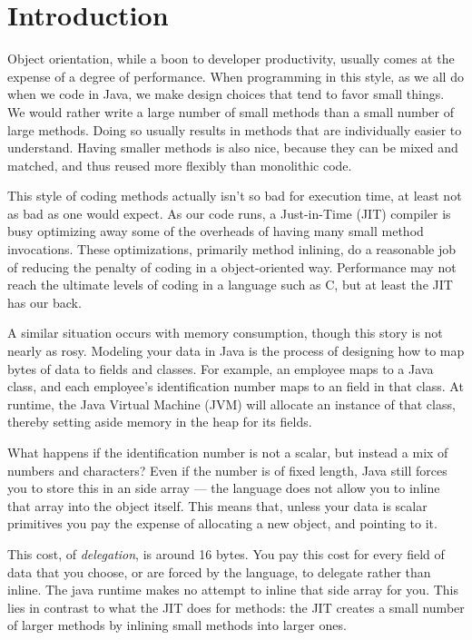 
\chapter{Introduction}
\label{chapter:introduction}

Object orientation, while a boon to developer productivity, usually comes at the
expense of a degree of performance. When programming in this style, as we all do
when we code in Java, we make design choices that tend to favor small things.
We would rather write a large number of small methods than a small number of
large methods. Doing so usually results in methods that are individually easier
to understand. Having smaller methods is also nice, because they can be mixed
and matched, and thus reused more flexibly than monolithic code.

This style of coding methods actually isn't so bad for execution time, at least
not as bad as one would expect. As our code runs, a Just-in-Time (JIT) compiler
is busy optimizing away some of the overheads of having many small method
invocations. These optimizations, primarily method inlining, do a reasonable job
of reducing the penalty of coding in a object-oriented way. Performance may not
reach the ultimate levels of coding in a language such as C, but at least the
JIT has our back.

A similar situation occurs with memory consumption, though this story is not
nearly as rosy.
Modeling your data in Java is the process of designing how to map bytes of data
to fields and classes.
For example, an employee maps to a  Java class, and each
employee's identification number maps to an  field in that class. At
runtime, the Java Virtual Machine (JVM) will allocate an instance of that class,
thereby setting aside memory in the heap for its fields.

What happens if the identification number is not a scalar, but instead a mix of
numbers and characters? Even if the number is of fixed length, Java still forces
you to store this in an side array --- the language does not allow you to inline
that array into the  object itself. This means that, unless
your data is scalar primitives you pay the expense of allocating a new object,
and pointing to it. 

This cost, of \emph{delegation}, is around 16 bytes. You pay this cost for every
field of data that you choose, or are forced by the language, to delegate rather
than inline. The java runtime makes no attempt to inline that side array
for you. This lies in contrast to what the JIT does for methods: the JIT creates a
small number of larger methods by inlining small methods into larger ones.

